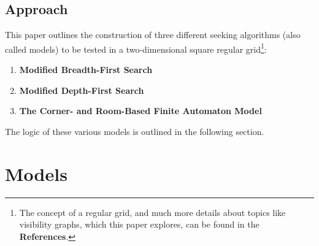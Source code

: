 \documentclass[12pt]{article}
\begin{document}
\subsection{Approach}
This paper outlines the construction of three different seeking algorithms (also called models) to be tested in a two-dimensional square regular grid\footnote{The concept of a regular grid, and much more details about topics like visibility graphs, which this paper explores, can be found in the \textbf{References}\cite{Path}.}:

\begin{enumerate}
\item \textbf{Modified Breadth-First Search}
\item \textbf{Modified Depth-First Search}
\item \textbf{The Corner- and Room-Based Finite Automaton Model}
\end{enumerate}

The logic of these various models is outlined in the following section.

\section{Models} \label{models}
\end{document}
